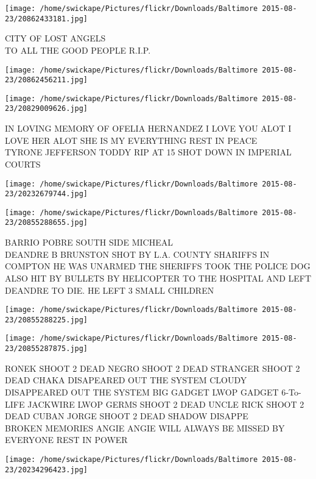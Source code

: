 \documentclass[10pt,letterpaper]{article}
\begin{document}
\vspace{0.25in}
\texttt{[image: /home/swickape/Pictures/flickr/Downloads/Baltimore 2015-08-23/20862433181.jpg]}

CITY OF LOST ANGELS\\
TO ALL THE GOOD PEOPLE R.I.P.
\pagebreak

\texttt{[image: /home/swickape/Pictures/flickr/Downloads/Baltimore 2015-08-23/20862456211.jpg]}

\vspace{0.25in}
\texttt{[image: /home/swickape/Pictures/flickr/Downloads/Baltimore 2015-08-23/20829009626.jpg]}

IN LOVING MEMORY OF OFELIA HERNANDEZ I LOVE YOU ALOT I LOVE HER ALOT SHE IS MY EVERYTHING REST IN PEACE\\
TYRONE JEFFERSON TODDY RIP AT 15 SHOT DOWN IN IMPERIAL COURTS
\pagebreak

\texttt{[image: /home/swickape/Pictures/flickr/Downloads/Baltimore 2015-08-23/20232679744.jpg]}

\vspace{0.25in}
\texttt{[image: /home/swickape/Pictures/flickr/Downloads/Baltimore 2015-08-23/20855288655.jpg]}

BARRIO POBRE SOUTH SIDE MICHEAL\\
DEANDRE B BRUNSTON SHOT BY L.A. COUNTY SHARIFFS IN COMPTON HE WAS UNARMED THE SHERIFFS TOOK THE POLICE DOG ALSO HIT BY BULLETS BY HELICOPTER TO THE HOSPITAL AND LEFT DEANDRE TO DIE.  HE LEFT 3 SMALL CHILDREN
\pagebreak

\texttt{[image: /home/swickape/Pictures/flickr/Downloads/Baltimore 2015-08-23/20855288225.jpg]}

\vspace{0.25in}
\texttt{[image: /home/swickape/Pictures/flickr/Downloads/Baltimore 2015-08-23/20855287875.jpg]}

RONEK SHOOT 2 DEAD NEGRO SHOOT 2 DEAD STRANGER SHOOT 2 DEAD CHAKA DISAPEARED OUT THE SYSTEM CLOUDY DISAPPEARED OUT THE SYSTEM BIG GADGET LWOP GADGET 6{-}To{-}LIFE JACKWIRE LWOP GERMS SHOOT 2 DEAD UNCLE RICK SHOOT 2 DEAD CUBAN JORGE SHOOT 2 DEAD SHADOW DISAPPE\\
BROKEN MEMORIES ANGIE ANGIE WILL ALWAYS BE MISSED BY EVERYONE REST IN POWER
\pagebreak

\texttt{[image: /home/swickape/Pictures/flickr/Downloads/Baltimore 2015-08-23/20234296423.jpg]}
\end{document}
